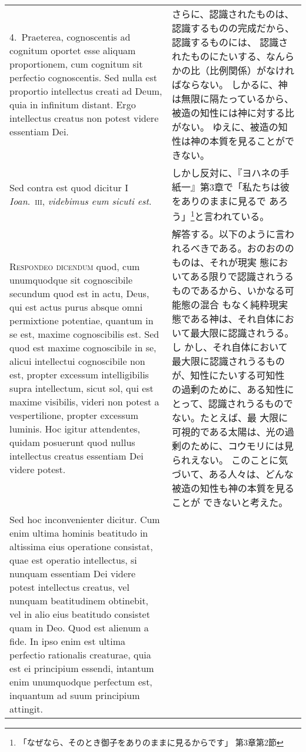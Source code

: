 \documentclass[10pt]{jsarticle} %
\begin{document}
\begin{longtable}{p{21em}p{21em}}
\\

4.~{\sc Praeterea}, cognoscentis ad cognitum oportet esse aliquam
proportionem, cum cognitum sit perfectio cognoscentis. Sed nulla est
proportio intellectus creati ad Deum, quia in infinitum distant. Ergo
intellectus creatus non potest videre essentiam Dei.

&

さらに、認識されたものは、認識するものの完成だから、認識するものには、
認識されたものにたいする、なんらかの比（比例関係）がなければならない。
しかるに、神は無限に隔たっているから、被造の知性には神に対する比がない。
ゆえに、被造の知性は神の本質を見ることができない。

\\

{\sc Sed contra est} quod dicitur I {\itshape Ioan}.~{\scshape iii},
{\it videbimus eum sicuti est}.

&

しかし反対に、『ヨハネの手紙一』第3章で「私たちは彼をありのままに見るで
あろう」\footnote{「なぜなら、そのとき御子をありのままに見るからです」
第3章第2節}と言われている。

\\

{\scshape Respondeo dicendum} quod, cum unumquodque sit cognoscibile
secundum quod est in actu, Deus, qui est actus purus absque omni
permixtione potentiae, quantum in se est, maxime cognoscibilis
est. Sed quod est maxime cognoscibile in se, alicui intellectui
cognoscibile non est, propter excessum intelligibilis supra
intellectum, sicut sol, qui est maxime visibilis, videri non potest a
vespertilione, propter excessum luminis. Hoc igitur attendentes,
quidam posuerunt quod nullus intellectus creatus essentiam Dei videre
potest.

&

解答する。以下のように言われるべきである。おのおののものは、それが現実
態においてある限りで認識されうるものであるから、いかなる可能態の混合
もなく純粋現実態である神は、それ自体において最大限に認識されうる。し
かし、それ自体において最大限に認識されうるものが、知性にたいする可知性
の過剰のために、ある知性にとって、認識されうるものでない。たとえば、最
大限に可視的である太陽は、光の過剰のために、コウモリには見られえない。
このことに気づいて、ある人々は、どんな被造の知性も神の本質を見ることが
できないと考えた。

\\

Sed hoc inconvenienter dicitur. Cum enim ultima hominis beatitudo in
altissima eius operatione consistat, quae est operatio intellectus, si
nunquam essentiam Dei videre potest intellectus creatus, vel nunquam
beatitudinem obtinebit, vel in alio eius beatitudo consistet quam in
Deo. Quod est alienum a fide.  In ipso enim est ultima perfectio
rationalis creaturae, quia est ei principium essendi, intantum enim
unumquodque perfectum est, inquantum ad suum principium attingit.


\end{longtable}
\end{document}
